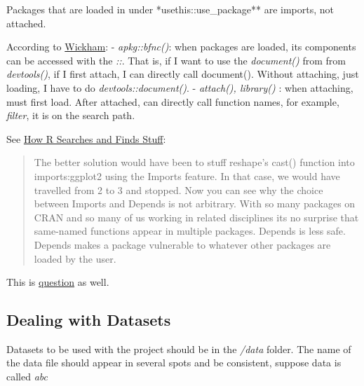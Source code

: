 \documentclass[
]{article}
\begin{document}
Packages that are loaded in under *usethis::use\_package** are imports,
not attached.

According to \href{http://r-pkgs.had.co.nz/namespace.html}{Wickham}: -
\emph{apkg::bfnc()}: when packages are loaded, its components can be
accessed with the \emph{::}. That is, if I want to use the
\emph{document()} from from \emph{devtools()}, if I first attach, I can
directly call document(). Without attaching, just loading, I have to do
\emph{devtools::document()}. - \emph{attach(), library()} : when
attaching, must first load. After attached, can directly call function
names, for example, \emph{filter}, it is on the search path.

See
\href{http://blog.obeautifulcode.com/R/How-R-Searches-And-Finds-Stuff/}{How
R Searches and Finds Stuff}:

\begin{quote}
The better solution would have been to stuff reshape's cast() function
into imports:ggplot2 using the Imports feature. In that case, we would
have travelled from 2 to 3 and stopped. Now you can see why the choice
between Imports and Depends is not arbitrary. With so many packages on
CRAN and so many of us working in related disciplines its no surprise
that same-named functions appear in multiple packages. Depends is less
safe. Depends makes a package vulnerable to whatever other packages are
loaded by the user.
\end{quote}

This is
\href{https://stackoverflow.com/questions/8637993/better-explanation-of-when-to-use-imports-depends}{question}
as well.

\hypertarget{dealing-with-datasets}{%
\subsection{Dealing with Datasets}\label{dealing-with-datasets}}

Datasets to be used with the project should be in the \emph{/data}
folder. The name of the data file should appear in several spots and be
consistent, suppose data is called \emph{abc}
\end{document}
